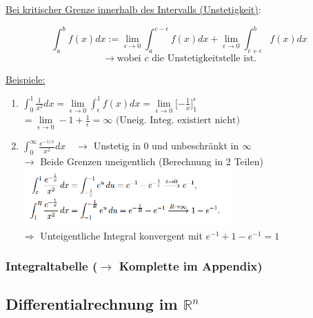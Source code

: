 \documentclass[6pt]{article}
\begin{document}
\begin{multicols*}{3}
	\vspace{5mm}
	
	\underline{Bei kritischer Grenze innerhalb des Intervalls (Unstetigkeit)}:
	
	\[
		\int_{a}^{b} f(x)  dx :=  \lim\limits_{\epsilon \to 0} \int_{a}^{c-\epsilon} f(x)  dx +  \lim\limits_{\epsilon \to 0} \int_{c+\epsilon}^{b} f(x)  dx	
	\]
	\[
		\rightarrow \text{wobei $c$ die Unstetigkeitstelle ist.}
	\]
	\vspace{2mm}
		
	\underline{Beispiele:} \vspace{-1mm}\\
	\begin{enumerate}[leftmargin=*,align=left]
		\item 	$ \int_{0}^{1} \frac{1}{x^2}  dx = \lim\limits_{\epsilon \to 0}  \int_{\epsilon}^{1}f(x) dx =  \lim\limits_{\epsilon \to 0} \lbrack-\frac{1}{x}\rbrack_{1}^{\epsilon} 		$ \\
		$ = \lim\limits_{\epsilon \to 0} -1 + \frac{1}{\epsilon} = \infty \text{  (Uneig. Integ. existiert nicht)}$
		\item $ \int_{0}^{\infty} \frac{e^{-1/x}}{x^2}  dx \quad \rightarrow$ Unstetig in 0 und unbeschr{\"a}nkt in $\infty$ \vspace{1mm}\\
			$\longrightarrow$ Beide Grenzen uneigentlich (Berechnung in 2 Teilen) \vspace{1mm}\\
				\includegraphics[width=230pt]{images/beispiel_uneigInteg}  \\
			$\Rightarrow$ Unteigentliche Integral konvergent mit $e^{-1} + 1 - e^{-1} = 1	$
	\end{enumerate}
		
	\columnbreak
	\subsubsection*{Integraltabelle ($\rightarrow$ Komplette im Appendix)}




\pagebreak
\subsection*{Differentialrechnung im $\mathbb{R}^n$}


\end{multicols*}
\end{document}
